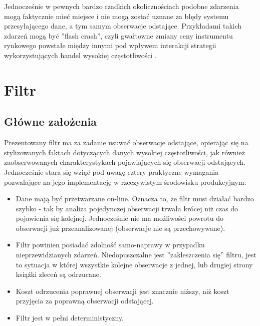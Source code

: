 \documentclass[a4paper,12pt,openany, DIV=calc, headsepline]{scrbook}
\begin{document}
Jednocześnie w pewnych bardzo rzadkich okolicznościach podobne zdarzenia mogą faktycznie mieć miejsce i nie mogą zostać uznane za błędy systemu przesyłającego dane, a tym samym obserwacje odstające. Przykładami takich zdarzeń mogą być ''flash crash'', czyli gwałtowne zmiany ceny instrumentu rynkowego powstałe między innymi pod wpływem interakcji strategii wykorzystujących handel wysokiej częstotliwości \citep{Easley2010}.

\chapter{Filtr}

\newcommand{\Spt}{\ensuremath{Sp_{t}} }

\newcommand{\MSpc}{\ensuremath{Sp_{t|t-1}} }
\newcommand{\MSpn}{\ensuremath{Sp_{t+1|t}} }
\newcommand{\MSpo}{\ensuremath{Sp_{t-1|t-1}} }

\newcommand{\ts}{\ensuremath{{t}} }
\newcommand{\tsl}{\ensuremath{{t-1}} }



\section{Główne założenia}

Prezentowany filtr ma za zadanie usuwać obserwacje odstające, opierając się na stylizowanych faktach dotyczących danych wysokiej częstotliwości, jak również zaobserwowanych charakterystykach pojawiających się obserwacji odstających. Jednocześnie stara się wziąć pod uwagę cztery praktyczne wymagania pozwalające na jego implementację w rzeczywistym środowisku produkcyjnym:


\begin{itemize}
\item Dane mają być przetwarzane on-line. Oznacza to, że filtr musi działać bardzo szybko - tak by analiza pojedynczej obserwacji trwała krócej niż czas do pojawienia się kolejnej. Jednocześnie nie ma możliwości powrotu do obserwacji już przeanalizowanej (obserwacje nie są przechowywane).
\item Filtr powinien posiadać zdolność samo-naprawy w przypadku nieprzewidzianych zdarzeń. Niedopuszczalne jest ''zakleszczenia się'' filtru, jest to sytuacja w której wszystkie kolejne obserwacje z jednej, lub drugiej strony książki zleceń są odrzucane.
\item Koszt odrzucenia poprawnej obserwacji jest znacznie niższy, niż koszt przyjęcia za poprawną obserwacji odstającej. 
\item Filtr jest w pełni deterministyczny.
\end{itemize} 
\end{document}
